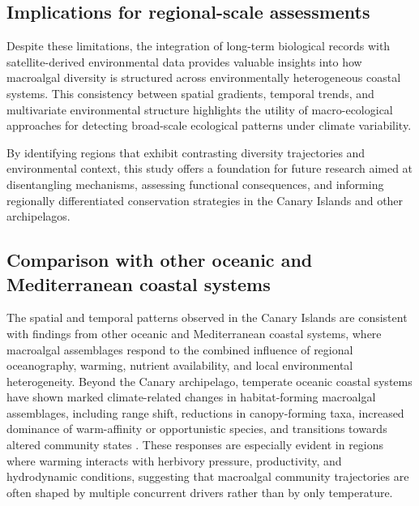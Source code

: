 \documentclass[a4paper,fleqn]{cas-sc}
\begin{document}
\subsection{Implications for regional-scale assessments}

Despite these limitations, the integration of long-term biological records with satellite-derived environmental data provides valuable insights into how macroalgal diversity is structured across environmentally heterogeneous coastal systems. This consistency between spatial gradients, temporal trends, and multivariate environmental structure highlights the utility of macro-ecological approaches for detecting broad-scale ecological patterns under climate variability. 

By identifying regions that exhibit contrasting diversity trajectories and environmental context, this study offers a foundation for future research aimed at disentangling mechanisms, assessing functional consequences, and informing regionally differentiated conservation strategies in the Canary Islands and other archipelagos.

\subsection{Comparison with other oceanic and Mediterranean coastal systems}

The spatial and temporal patterns observed in the Canary Islands are consistent with findings from other oceanic and Mediterranean coastal systems, where macroalgal assemblages respond to the combined influence of regional oceanography, warming, nutrient availability, and local environmental heterogeneity. Beyond the Canary archipelago, temperate oceanic coastal systems have shown marked climate-related changes in habitat-forming macroalgal assemblages, including range shift, reductions in canopy-forming taxa, increased dominance of warm-affinity or opportunistic species, and transitions towards altered community states \citep{Vergesetal2016, Wernbergetal2016}. These responses are especially evident in regions where warming interacts with herbivory pressure, productivity, and hydrodynamic conditions, suggesting that macroalgal community trajectories are often shaped by multiple concurrent drivers rather than by only temperature.
\end{document}
